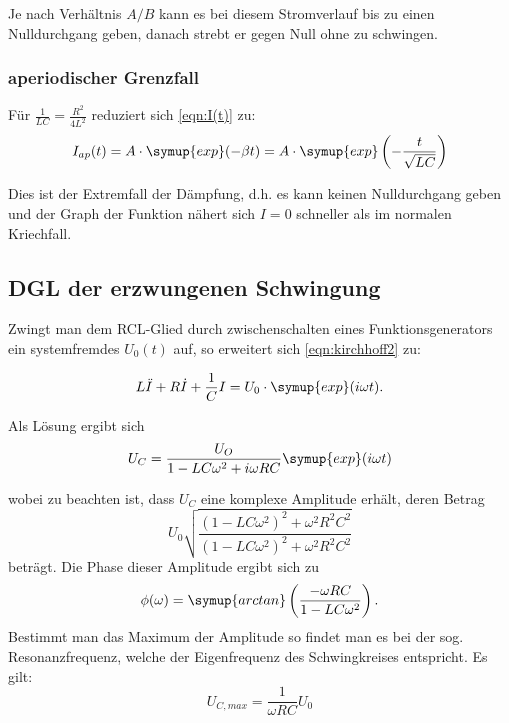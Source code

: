 Je nach Verhältnis $A/B$ kann es bei diesem Stromverlauf bis zu einen Nulldurchgang geben, danach strebt er gegen Null ohne zu schwingen.

\subsubsection{aperiodischer Grenzfall}
Für $\frac{1}{LC} = \frac{R^2}{4L^2}$ reduziert sich \eqref{eqn:I(t)} zu:
\begin{equation}
  I_{ap}(t)= A \cdot \symup{exp}(-\beta t) = A \cdot \symup{exp}\left(- \frac{t}{\sqrt{LC}}\right)
  \label{eqn:AP(t)}
\end{equation}

Dies ist der Extremfall der Dämpfung, d.h. es kann keinen Nulldurchgang geben und der Graph der Funktion nähert sich $I=0$ schneller als im normalen Kriechfall.

\subsection{DGL der erzwungenen Schwingung}
Zwingt man dem RCL-Glied durch zwischenschalten eines Funktionsgenerators ein systemfremdes $U_0(t)$ auf, so erweitert sich \eqref{eqn:kirchhoff2} zu:

\begin{equation}
  L \ddot{I} + R \dot{I} + \frac{1}{C} I = U_0 \cdot \symup{exp}(i \omega t).
\end{equation}

Als Lösung ergibt sich
\begin{equation}
  U_C = \frac{U_O}{1-LC \omega^2 + i\omega RC} \symup{exp}(i\omega t)
  \label{eqn:U_C}
\end{equation}

wobei zu beachten ist, dass $U_C$ eine komplexe Amplitude erhält, deren Betrag
\begin{equation*}
U_0 \sqrt{\frac{(1-LC\omega^2)^2+\omega^2 R^2 C^2}{(1-LC\omega^2)^2 + \omega^2 R^2 C^2}}
\end{equation*}
beträgt.
Die Phase dieser Amplitude ergibt sich zu
\begin{equation*}
\phi(\omega)=\symup{arctan}\left(\frac{-\omega RC}{1-LC\omega^2}\right).
\end{equation*}
Bestimmt man das Maximum der Amplitude so findet man es bei der sog. Resonanzfrequenz, welche der Eigenfrequenz \omega des Schwingkreises entspricht. Es gilt:
\begin{equation}
  U_{C,max} = \frac{1}{\omega RC} U_0
  \label{eqn:Resonanz}
\end{equation}

